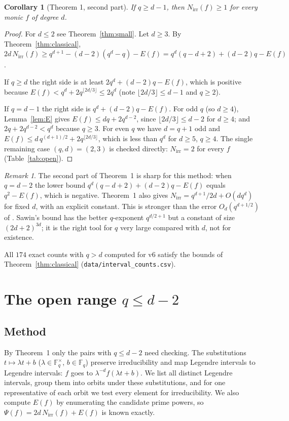 \documentclass[11pt,a4paper]{article}
\newtheorem{corollary}[theorem]{Corollary}
\theoremstyle{definition}
\theoremstyle{remark}
\newtheorem{remark}[theorem]{Remark}
\newcommand{\Fq}{\mathbb{F}_q}
\newcommand{\Nirr}{N_{\mathrm{irr}}}
\begin{document}
\begin{corollary}[Theorem 1, second part]\label{cor:classical}
If $q\ge d-1$, then $\Nirr(f)\ge1$ for every monic $f$ of degree $d$.
\end{corollary}

\begin{proof}
For $d\le2$ see Theorem~\ref{thm:small}. Let $d\ge3$. By Theorem~\ref{thm:classical},
$2d\,\Nirr(f)\ge q^{d+1}-(d-2)(q^d-q)-E(f)=q^d(q-d+2)+(d-2)q-E(f)$.

If $q\ge d$ the right side is at least $2q^d+(d-2)q-E(f)$, which is positive because
$E(f)<q^d+2q^{\lfloor2d/3\rfloor}\le 2q^d$ (note $\lfloor 2d/3\rfloor\le d-1$ and $q\ge2$).

If $q=d-1$ the right side is $q^d+(d-2)q-E(f)$. For odd $q$ (so $d\ge4$),
Lemma~\ref{lem:E} gives $E(f)\le dq+2q^{d-2}$, since $\lfloor2d/3\rfloor\le d-2$ for $d\ge4$;
and $2q+2q^{d-2}<q^d$ because $q\ge3$. For even $q$ we have $d=q+1$ odd and
$E(f)\le d\,q^{(d+1)/2}+2q^{\lfloor2d/3\rfloor}$, which is less than $q^d$ for $d\ge5$, $q\ge4$.
The single remaining case $(q,d)=(2,3)$ is checked directly: $\Nirr=2$ for every $f$
(Table~\ref{tab:open}).
\end{proof}

\begin{remark}
The second part of Theorem~1 is sharp for this method: when $q=d-2$ the lower bound
$q^d(q-d+2)+(d-2)q-E(f)$ equals $q^2-E(f)$, which is negative. Theorem~1 also gives
$\Nirr=q^{d+1}/2d+O(dq^d)$ for fixed $d$, with an explicit constant. This is stronger than
the error $O_d(q^{d+1/2})$ of \cite{BBR2015}. Sawin's bound \cite{Sawin2021} has the better
$q$-exponent $q^{d/2+1}$ but a constant of size $(2d+2)^{3d}$; it is the right tool for $q$ very
large compared with $d$, not for existence.
\end{remark}

All $174$ exact counts with $q>d$ computed for v6 satisfy the bounds of Theorem~\ref{thm:classical}
(\texttt{data/interval\_counts.csv}).

\section{The open range $q\le d-2$}\label{sec:open}

\subsection{Method}
By Theorem~1 only the pairs with $q\le d-2$ need checking. The substitutions
$t\mapsto\lambda t+b$ ($\lambda\in\Fq^\times$, $b\in\Fq$) preserve irreducibility and map Legendre
intervals to Legendre intervals: $f$ goes to $\lambda^{-d}f(\lambda t+b)$. We list all distinct
Legendre intervals, group them into orbits under these substitutions, and for one representative
of each orbit we test every element for irreducibility. We also compute $E(f)$ by enumerating the
candidate prime powers, so $\Psi(f)=2d\,\Nirr(f)+E(f)$ is known exactly.
\end{document}
